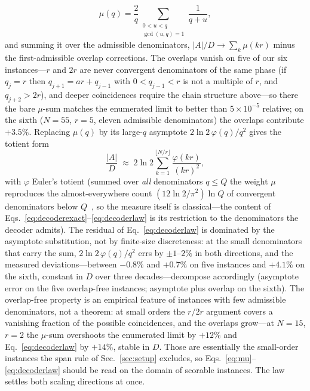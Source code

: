 \documentclass[aps,pra,reprint,superscriptaddress,nofootinbib,floatfix]{revtex4-2}
\begin{document}
\begin{equation}
\mu(q)=\frac{2}{q}\sum_{\substack{0<u<q\\ \gcd(u,q)=1}}\frac{1}{q+u},
\label{eq:mu}
\end{equation}
and summing it over the admissible denominators,
$\lvert A\rvert/D\to\sum_{k}\mu(kr)$ minus the first-admissible
overlap corrections. The overlaps vanish on five of our six
instances---$r$ and $2r$ are never convergent denominators of the
same phase (if $q_j=r$ then $q_{j+1}=ar+q_{j-1}$ with
$0<q_{j-1}<r$ is not a multiple of $r$, and $q_{j+2}>2r$), and
deeper coincidences require the chain structure above---so there the
bare $\mu$-sum matches the enumerated limit to better than
$5\times10^{-5}$ relative; on the sixth ($N=55$, $r=5$, eleven
admissible denominators) the overlaps contribute $+3.5\%$. Replacing
$\mu(q)$ by its large-$q$ asymptote $2\ln2\,\varphi(q)/q^2$ gives the
totient form
\begin{equation}
\frac{\lvert A\rvert}{D}\;\approx\;
2\ln 2\sum_{k=1}^{\lfloor N/r\rfloor}\frac{\varphi(kr)}{(kr)^2},
\label{eq:decoderlaw}
\end{equation}
with $\varphi$ Euler's totient (summed over \emph{all} denominators
$q\le Q$ the weight $\mu$ reproduces the almost-everywhere count
$(12\ln2/\pi^2)\ln Q$ of convergent denominators below
$Q$~\cite{khinchin1964}, so the measure itself is classical---the
content of Eqs.~\eqref{eq:decoderexact}--\eqref{eq:decoderlaw} is its
restriction to the denominators the decoder admits). The residual of
Eq.~\eqref{eq:decoderlaw} is dominated by the asymptote substitution,
not by finite-size discreteness: at the small denominators that carry
the sum, $2\ln2\,\varphi(q)/q^2$ errs by $\pm1$--$2\%$ in both
directions, and the measured deviations---between $-0.8\%$ and
$+0.7\%$ on five instances and $+4.1\%$ on the sixth, constant in $D$
over three decades---decompose accordingly (asymptote error on the
five overlap-free instances; asymptote plus overlap on the sixth).
The overlap-free property is an empirical feature of instances with
few admissible denominators, not a theorem: at small orders the
$r/2r$ argument covers a vanishing fraction of the possible
coincidences, and the overlaps grow---at $N{=}15$, $r{=}2$ the
$\mu$-sum overshoots the enumerated limit by $+12\%$ and
Eq.~\eqref{eq:decoderlaw} by $+14\%$, stable in $D$. Those are
essentially the small-order instances the span rule of
Sec.~\ref{sec:setup} excludes, so
Eqs.~\eqref{eq:mu}--\eqref{eq:decoderlaw} should be read on the
domain of scorable instances. The law settles both scaling directions at once.
\end{document}
